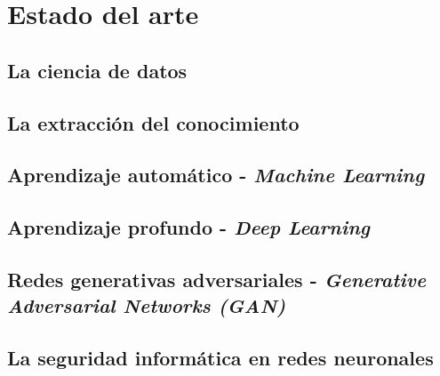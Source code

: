 


\section{Estado del arte}
\label{ch:2:section:state-of-the-art}

\subsection{La ciencia de datos}

\subsection{La extracción del conocimiento}

\subsection{Aprendizaje automático - \textit{Machine Learning}}

\subsection{Aprendizaje profundo - \textit{Deep Learning}}

\subsection{Redes generativas adversariales - \textit{Generative Adversarial Networks (GAN)}}

\subsection{La seguridad informática en redes neuronales}
\label{ch:2:section:state-of-the-art:computer-security-in-neural-networks}

